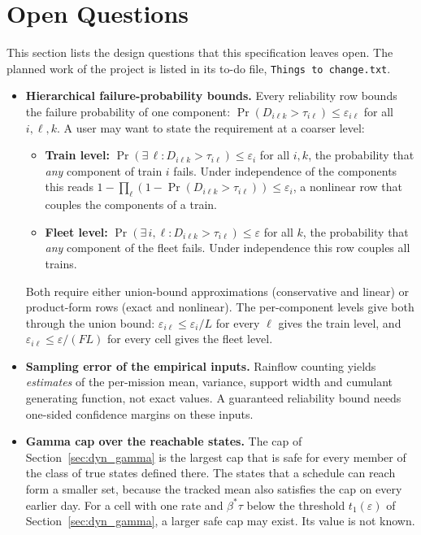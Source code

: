 \section{Open Questions}
\label{sec:open}

This section lists the design questions that this specification leaves open.
The planned work of the project is listed in its to-do file,
\texttt{Things to change.txt}.

\begin{itemize}[leftmargin=1.5em]
  \item \textbf{Hierarchical failure-probability bounds.}
        Every reliability row bounds the failure probability of one component:
        $\Pr(D_{i\ell k} > \tau_{i\ell}) \leq \varepsilon_{i\ell}$ for all $i, \ell, k$.
        A user may want to state the requirement at a coarser level:
        \begin{itemize}
          \item \textbf{Train level:} $\Pr(\exists\,\ell : D_{i\ell k} > \tau_{i\ell}) \leq \varepsilon_i$
                for all $i, k$, the probability that \emph{any} component of train $i$
                fails. Under independence of the components this reads
                $1 - \prod_\ell (1 - \Pr(D_{i\ell k} > \tau_{i\ell})) \leq \varepsilon_i$,
                a nonlinear row that couples the components of a train.
          \item \textbf{Fleet level:} $\Pr(\exists\,i,\ell : D_{i\ell k} > \tau_{i\ell}) \leq \varepsilon$
                for all $k$, the probability that \emph{any} component of the fleet fails.
                Under independence this row couples all trains.
        \end{itemize}
        Both require either union-bound approximations (conservative and linear) or
        product-form rows (exact and nonlinear). The per-component levels give both
        through the union bound: $\varepsilon_{i\ell} \leq \varepsilon_i / L$ for every
        $\ell$ gives the train level, and $\varepsilon_{i\ell} \leq \varepsilon/(FL)$
        for every cell gives the fleet level.
  \item \textbf{Sampling error of the empirical inputs.}
        Rainflow counting yields \emph{estimates} of the per-mission mean, variance,
        support width and cumulant generating function, not exact values. A guaranteed
        reliability bound needs one-sided confidence margins on these inputs.
  \item \textbf{Gamma cap over the reachable states.}
        The cap of Section~\ref{sec:dyn_gamma} is the largest cap that is safe for every
        member of the class of true states defined there. The states that a schedule can
        reach form a smaller set, because the tracked mean also satisfies the cap on every
        earlier day. For a cell with one rate and $\beta^*\tau$ below the threshold
        $t_1(\varepsilon)$ of Section~\ref{sec:dyn_gamma}, a larger safe cap may exist.
        Its value is not known.
\end{itemize}

